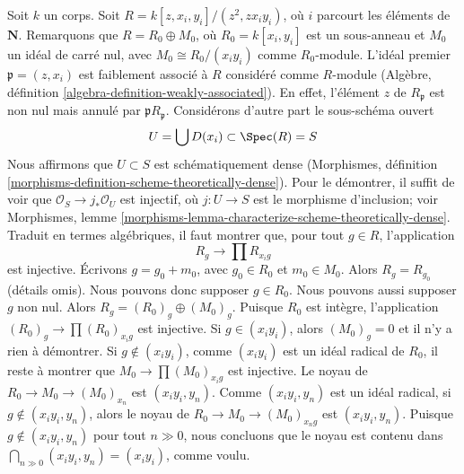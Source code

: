 \noindent
Soit $k$ un corps. Soit $R = k[z, x_i, y_i]/(z^2, zx_iy_i)$, où
$i$ parcourt les éléments de $\mathbf{N}$. Remarquons que $R = R_0 \oplus M_0$, où
$R_0 = k[x_i, y_i]$ est un sous-anneau et $M_0$ un idéal de carré nul,
avec $M_0 \cong R_0/(x_iy_i)$ comme $R_0$-module. L'idéal premier
$\mathfrak p = (z, x_i)$ est faiblement associé à $R$ considéré comme $R$-module
(Algèbre, définition \ref{algebra-definition-weakly-associated}).
En effet, l'élément $z$ de $R_\mathfrak p$ est non nul mais annulé
par $\mathfrak pR_\mathfrak p$. Considérons d'autre part le sous-schéma
ouvert
$$
U = \bigcup D(x_i) \subset \Spec(R) = S
$$
Nous affirmons que $U \subset S$ est schématiquement dense
(Morphismes, définition \ref{morphisms-definition-scheme-theoretically-dense}).
Pour le démontrer, il suffit de voir que $\mathcal{O}_S \to j_*\mathcal{O}_U$
est injectif, où $j : U \to S$ est le morphisme d'inclusion; voir
Morphismes, lemme \ref{morphisms-lemma-characterize-scheme-theoretically-dense}.
Traduit en termes algébriques, il faut montrer que, pour tout $g \in R$,
l'application
$$
R_g \longrightarrow \prod R_{x_ig}
$$
est injective. Écrivons $g = g_0 + m_0$, avec $g_0 \in R_0$ et $m_0 \in M_0$.
Alors $R_g = R_{g_0}$ (détails omis). Nous pouvons donc supposer $g \in R_0$.
Nous pouvons aussi supposer $g$ non nul. Alors $R_g = (R_0)_g \oplus (M_0)_g$.
Puisque $R_0$ est intègre, l'application $(R_0)_g \to \prod (R_0)_{x_ig}$ est
injective. Si $g \in (x_iy_i)$, alors $(M_0)_g = 0$ et il n'y a rien
à démontrer. Si $g \not \in (x_iy_i)$, comme
$(x_iy_i)$ est un idéal radical de $R_0$, il reste à montrer que
$M_0 \to \prod (M_0)_{x_ig}$ est injective. Le noyau de
$R_0 \to M_0 \to (M_0)_{x_n}$ est $(x_iy_i, y_n)$. Comme
$(x_iy_i, y_n)$ est un idéal radical, si $g \not \in (x_iy_i, y_n)$,
alors le noyau de $R_0 \to M_0 \to (M_0)_{x_ng}$ est $(x_iy_i, y_n)$.
Puisque $g \not \in (x_iy_i, y_n)$ pour tout $n \gg 0$, nous concluons que
le noyau est contenu dans $\bigcap_{n \gg 0} (x_iy_i, y_n) = (x_iy_i)$,
comme voulu.

